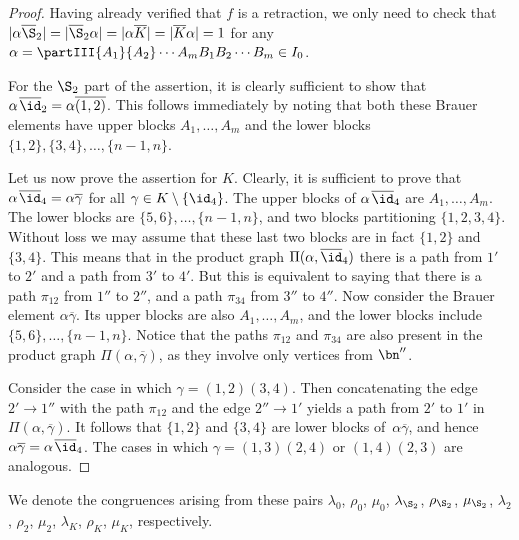 \begin{proof}
Having already verified that $f$ is a retraction, we only need to check that
$|\alpha\overline{\S}_2|=|\overline{\S}_2\alpha|=|\alpha \overline{K}|=|\overline{K}\alpha|=1$ for any
$\alpha=\partIII{A_1}{A_2}\cdots{A_{m}}{B_1}{B_2}\cdots{B_{m}}\in I_0$.

For the $\S_2$ part of the assertion, it is clearly sufficient to show
that $\alpha\;\!\overline{\id}_2=\alpha\overline{(1, 2)}$.
This
follows immediately by noting that both these Brauer elements have upper blocks $A_1,\dots,A_m$ and the lower blocks $\{1,2\},\{3,4\},\dots,\{n-1,n\}$.

Let us now prove the assertion for $K$.
Clearly, it is sufficient to prove that
$\alpha \;\!\overline{\id}_4=\alpha\overline{\gamma}$
for all $\gamma\in K\setminus\{\id_4\}$.
The upper blocks of $\alpha\;\!\overline{\id}_4$ are $A_1,\dots,A_m$.
The lower blocks are $\{5,6\},\dots,\{n-1,n\}$, and two blocks
partitioning $\{1,2,3,4\}$.
Without loss we may assume that these last two blocks are in fact $\{1,2\}$ and $\{3,4\}$.
This means that in the product graph $\Pi(\alpha,\overline{\id}_4)$
there is a path from $1'$ to $2'$ and a path from $3'$ to $4'$.
But this is equivalent to saying that there is a path $\pi_{12}$ from $1''$ to $2''$, and a path $\pi_{34}$ from $3''$ to $4''$.
%
Now consider the Brauer element $\alpha\overline{\gamma}$.
Its upper blocks are also $A_1,\dots,A_m$, and the lower blocks include $\{5,6\},\dots,\{n-1,n\}$.
Notice that the paths $\pi_{12}$ and $\pi_{34}$ are also present in the product graph $\Pi(\alpha,\overline{\gamma})$, as they involve only vertices from $\bn''$.

Consider the case in which $\gamma=(1,2)(3,4)$. Then concatenating the edge $2'\to1''$ with the path $\pi_{12}$ and the edge $2''\to1'$ yields a path from $2'$ to $1'$ in $\Pi(\alpha,\overline{\gamma})$.
It follows that $\{1,2\}$ and $\{3,4\}$ are lower blocks of~$\alpha\overline{\gamma}$, and hence $\alpha\overline{\gamma}=\alpha\;\!\overline{\id}_4$.
%
The cases in which $\gamma=(1,3)(2,4)$ or $(1,4)(2,3)$ are analogous. \end{proof}

We denote the congruences arising from these pairs
$\lambda_0$, $\rho_0$, $\mu_0$, $\lambda_{\S_2}$, $\rho_{\S_2}$, $\mu_{\S_2}$,
$\lambda_2$, $\rho_2$, $\mu_2$, $\lambda_K$, $\rho_K$, $\mu_K$, respectively.

